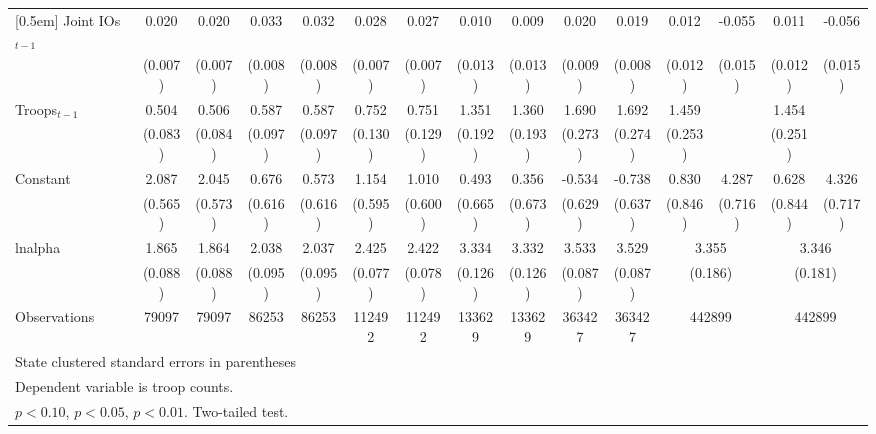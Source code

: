 \begin{table}[htbp]
\begin{tabular}{l*{14}{c}}
[0.5em]
Joint IOs$_{t-1}$ &0.020\sym{**}&0.020\sym{**}&0.033\sym{**}&0.032\sym{**}&0.028\sym{**}&0.027\sym{**}&0.010&0.009&0.020\sym{*}&0.019\sym{*}&0.012&-0.055\sym{**}&0.011&-0.056\sym{**}\\
&(0.007)&(0.007)&(0.008)&(0.008)&(0.007)&(0.007)&(0.013)&(0.013)&(0.009)&(0.008)&(0.012)&(0.015)&(0.012)&(0.015)\\
[0.5em]
Troops$_{t-1}$ &0.504\sym{**}&0.506\sym{**}&0.587\sym{**}&0.587\sym{**}&0.752\sym{**}&0.751\sym{**}&1.351\sym{**}&1.360\sym{**}&1.690\sym{**}&1.692\sym{**}&1.459\sym{**}&&1.454\sym{**}\\
&(0.083)&(0.084)&(0.097)&(0.097)&(0.130)&(0.129)&(0.192)&(0.193)&(0.273)&(0.274)&(0.253)&&(0.251)\\
[0.5em]
Constant &2.087\sym{**}&2.045\sym{**}&0.676&0.573&1.154\sym{\dagger}&1.010\sym{\dagger}&0.493&0.356&-0.534&-0.738&0.830&4.287\sym{**}&0.628&4.326\sym{**}\\
&(0.565)&(0.573)&(0.616)&(0.616)&(0.595)&(0.600)&(0.665)&(0.673)&(0.629)&(0.637)&(0.846)&(0.716)&(0.844)&(0.717)\\
\hline
lnalpha &1.865\sym{**}&1.864\sym{**}&2.038\sym{**}&2.037\sym{**}&2.425\sym{**}&2.422\sym{**}&3.334\sym{**}&3.332\sym{**}&3.533\sym{**}&3.529\sym{**}&\multicolumn{2}{c}{3.355\sym{**}}&\multicolumn{2}{c}{3.346\sym{**}}\\
&(0.088)&(0.088)&(0.095)&(0.095)&(0.077)&(0.078)&(0.126)&(0.126)&(0.087)&(0.087)&\multicolumn{2}{c}{(0.186)}&\multicolumn{2}{c}{(0.181)}\\
\hline
Observations&79097&79097&86253&86253&112492&112492&133629&133629&363427&363427&\multicolumn{2}{c}{442899}&\multicolumn{2}{c}{442899}\\
\hline\hline
\multicolumn{11}{l}{\fontsize{7}{7}\selectfont State clustered standard errors in parentheses}\\
\multicolumn{11}{l}{\fontsize{7}{7}\selectfont Dependent variable is troop counts.}\\
\multicolumn{11}{l}{\fontsize{7}{7}\selectfont \sym{\dagger}\(p<0.10\), \sym{*}\(p<0.05\), \sym{**}\(p<0.01\). Two-tailed test.}\\
\end{tabular}
\end{table}
\vspace{-10mm}
